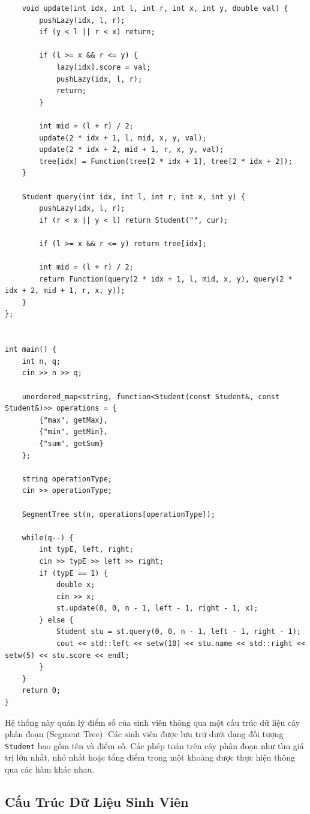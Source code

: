 \documentclass[a4paper]{article}
\begin{document}
\begin{verbatim}
    void update(int idx, int l, int r, int x, int y, double val) {
        pushLazy(idx, l, r);
        if (y < l || r < x) return;

        if (l >= x && r <= y) {
            lazy[idx].score = val;
            pushLazy(idx, l, r);
            return;
        }

        int mid = (l + r) / 2;
        update(2 * idx + 1, l, mid, x, y, val);
        update(2 * idx + 2, mid + 1, r, x, y, val);
        tree[idx] = Function(tree[2 * idx + 1], tree[2 * idx + 2]);
    }

    Student query(int idx, int l, int r, int x, int y) {
        pushLazy(idx, l, r);
        if (r < x || y < l) return Student("", cur);

        if (l >= x && r <= y) return tree[idx];

        int mid = (l + r) / 2;
        return Function(query(2 * idx + 1, l, mid, x, y), query(2 * idx + 2, mid + 1, r, x, y));
    }
};


int main() {
    int n, q;
    cin >> n >> q;

    unordered_map<string, function<Student(const Student&, const Student&)>> operations = {
        {"max", getMax},
        {"min", getMin},
        {"sum", getSum}
    };

    string operationType;
    cin >> operationType;

    SegmentTree st(n, operations[operationType]);

    while(q--) {
        int typE, left, right;
        cin >> typE >> left >> right;
        if (typE == 1) {
            double x;
            cin >> x;
            st.update(0, 0, n - 1, left - 1, right - 1, x);
        } else {
            Student stu = st.query(0, 0, n - 1, left - 1, right - 1);
            cout << std::left << setw(10) << stu.name << std::right << setw(5) << stu.score << endl;
        }
    }
    return 0;
}
\end{verbatim}

Hệ thống này quản lý điểm số của sinh viên thông qua một cấu trúc dữ liệu cây phân đoạn (Segment Tree). Các sinh viên được lưu trữ dưới dạng đối tượng \texttt{Student} bao gồm tên và điểm số. Các phép toán trên cây phân đoạn như tìm giá trị lớn nhất, nhỏ nhất hoặc tổng điểm trong một khoảng được thực hiện thông qua các hàm khác nhau.

\subsection{Cấu Trúc Dữ Liệu Sinh Viên}
\end{document}

